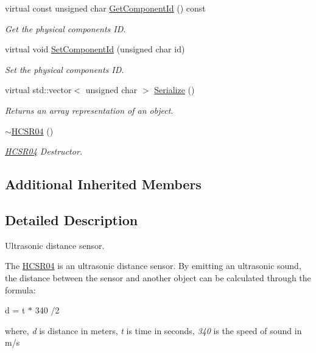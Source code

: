 \begin{DoxyCompactItemize}
virtual const unsigned char \hyperlink{classrbp_1_1HCSR04_ac4bfc202a0d42469017bac7aedf03d77}{Get\+Component\+Id} () const 
\begin{DoxyCompactList}\small\item\em Get the physical component\textquotesingle{}s I\+D. \end{DoxyCompactList}\item 
virtual void \hyperlink{classrbp_1_1HCSR04_a32db67ffcb0adac730ed32523ceec111}{Set\+Component\+Id} (unsigned char id)
\begin{DoxyCompactList}\small\item\em Set the physical component\textquotesingle{}s I\+D. \end{DoxyCompactList}\item 
virtual std\+::vector$<$ unsigned char $>$ \hyperlink{classrbp_1_1HCSR04_aa4a535b88dfdf50a75a2374193038c32}{Serialize} ()
\begin{DoxyCompactList}\small\item\em Returns an array representation of an object. \end{DoxyCompactList}\item 
\hypertarget{classrbp_1_1HCSR04_ab5d6f623fccd8bb1dd782df8945a381d}{}\hyperlink{classrbp_1_1HCSR04_ab5d6f623fccd8bb1dd782df8945a381d}{$\sim$\+H\+C\+S\+R04} ()\label{classrbp_1_1HCSR04_ab5d6f623fccd8bb1dd782df8945a381d}

\begin{DoxyCompactList}\small\item\em \hyperlink{classrbp_1_1HCSR04}{H\+C\+S\+R04} Destructor. \end{DoxyCompactList}\end{DoxyCompactItemize}
\subsection*{Additional Inherited Members}


\subsection{Detailed Description}
Ultrasonic distance sensor. 

The \hyperlink{classrbp_1_1HCSR04}{H\+C\+S\+R04} is an ultrasonic distance sensor. By emitting an ultrasonic sound, the distance between the sensor and another object can be calculated through the formula\+:

d = t $\ast$ 340 /2

where, {\itshape d} is distance in meters, {\itshape t} is time in seconds, {\itshape 340} is the speed of sound in m/s

